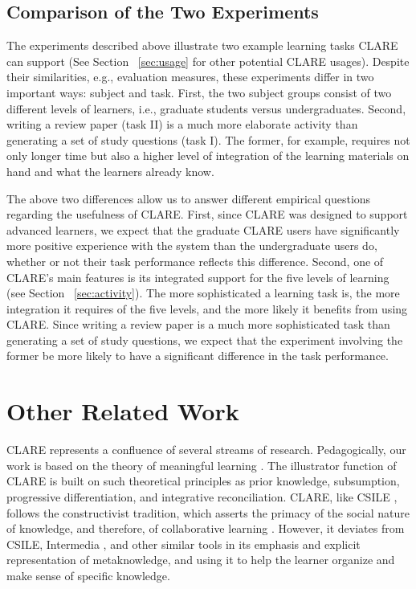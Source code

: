 \subsection{Comparison of the Two Experiments}
\label{sec:comparison}

The experiments described above illustrate two example learning tasks CLARE
can support (See Section ~\ref{sec:usage} for other potential CLARE
usages). Despite their similarities, e.g., evaluation measures, these
experiments differ in two important ways: subject and task. First, the two
subject groups consist of two different levels of learners, i.e., graduate
students versus undergraduates. Second, writing a review paper (task II) is
a much more elaborate activity than generating a set of study questions
(task I). The former, for example, requires not only longer time but also
a higher level of integration of the learning materials on hand and what
the learners already know.

The above two differences allow us to answer different empirical questions
regarding the usefulness of CLARE. First, since CLARE was designed to
support advanced learners, we expect that the graduate CLARE users have
significantly more positive experience with the system than the
undergraduate users do, whether or not their task performance reflects this
difference. Second, one of CLARE's main features is its integrated support
for the five levels of learning (see Section ~\ref{sec:activity}). The more
sophisticated a learning task is, the more integration it requires of the
five levels, and the more likely it benefits from using CLARE. Since
writing a review paper is a much more sophisticated task than generating a
set of study questions, we expect that the experiment involving the former
be more likely to have a significant difference in the task performance.


\section{Other Related Work}
\label{sec:related-work}

CLARE represents a confluence of several streams of research.
Pedagogically, our work is based on the theory of meaningful learning
\cite{Ausubel78,Novak84}. The illustrator function of CLARE is built on
such theoretical principles as prior knowledge, subsumption, progressive
differentiation, and integrative reconciliation. CLARE, like CSILE
\cite{Scardamalia91}, follows the constructivist tradition, which asserts
the primacy of the social nature of knowledge, and therefore, of
collaborative learning \cite{Slavin90}. However, it deviates from CSILE,
Intermedia \cite{Yankelovich88}, and other similar tools in its emphasis
and explicit representation of metaknowledge, and using it to help the
learner organize and make sense of specific knowledge.

